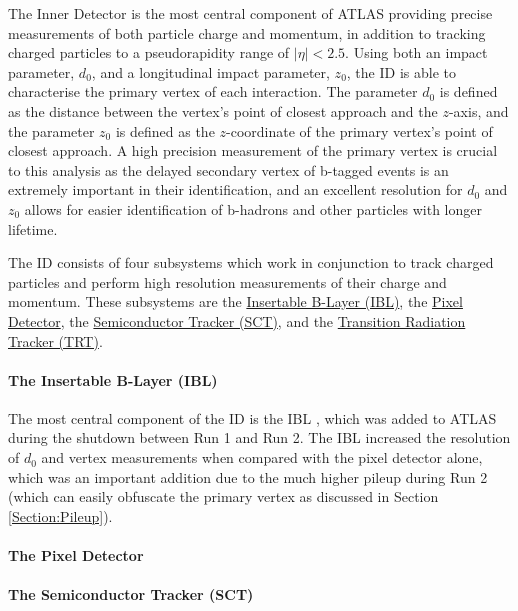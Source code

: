\documentclass[12pt,a4paper,epsf,portrait,times,epsfig]{article}
\begin{document}
		The Inner Detector \cite{ATLASID1, ATLASID2} is the most central component of ATLAS providing precise measurements of both particle charge and momentum, in addition to tracking charged particles to a pseudorapidity range of $|\eta| < 2.5$. Using both an impact parameter, $d_{0}$, and a longitudinal impact parameter, $z_{0}$, the ID is able to characterise the primary vertex of each interaction. The parameter $d_{0}$ is defined as the distance between the vertex's point of closest approach and the $z$-axis, and the parameter $z_{0}$ is defined as the $z$-coordinate of the primary vertex's point of closest approach. A high precision measurement of the primary vertex is crucial to this analysis as the delayed secondary vertex of b-tagged events is an extremely important in their identification, and an excellent resolution for $d_{0}$ and $z_{0}$ allows for easier identification of b-hadrons and other particles with longer lifetime. 

		The ID consists of four subsystems which work in conjunction to track charged particles and perform high resolution measurements of their charge and momentum. These subsystems are the \hyperref[Section:IBL]{Insertable B-Layer (IBL)}, the \hyperref[Section:PixelDetector]{Pixel Detector}, the \hyperref[Section:SCT]{Semiconductor Tracker (SCT)}, and the \hyperref[Section:TRT]{Transition Radiation Tracker (TRT)}.  

		\paragraph{The Insertable B-Layer (IBL)}\label{Section:IBL}

		The most central component of the ID is the IBL \cite{IBL-TDR}, which was added to ATLAS during the shutdown between Run 1 and Run 2. The IBL increased the resolution of $d_{0}$ and vertex measurements when compared with the pixel detector alone, which was an important addition due to the much higher pileup during Run 2 (which can easily obfuscate the primary vertex as discussed in Section \ref{Section:Pileup}).

		\paragraph{The Pixel Detector}\label{Section:PixelDetector}

		\paragraph{The Semiconductor Tracker (SCT)}\label{Section:SCT}
\end{document}
